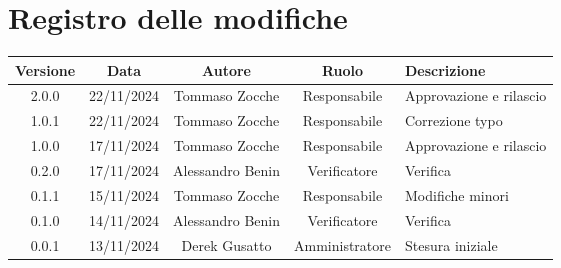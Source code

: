 \section{Registro delle modifiche}
\begin{table}[H]
    \begin{tabular}{|c|c|c|c|p{3cm}|}
        \hline
        \textbf{Versione} & \textbf{Data} & \textbf{Autore} & \textbf{Ruolo} & \textbf{Descrizione} \\
        \hline
        2.0.0 & 22/11/2024 & Tommaso Zocche & Responsabile & Approvazione e rilascio \\
        \hline
        1.0.1 & 22/11/2024 & Tommaso Zocche & Responsabile & Correzione typo \\
        \hline
        1.0.0 & 17/11/2024 & Tommaso Zocche & Responsabile & Approvazione e rilascio \\
        \hline
        0.2.0 & 17/11/2024 & Alessandro Benin & Verificatore & Verifica \\
        \hline
        0.1.1 & 15/11/2024 & Tommaso Zocche & Responsabile & Modifiche minori \\
        \hline
        0.1.0 & 14/11/2024 & Alessandro Benin & Verificatore & Verifica \\
        \hline
        0.0.1 & 13/11/2024 & Derek Gusatto & Amministratore & Stesura iniziale \\
        \hline
    \end{tabular}
\end{table}
